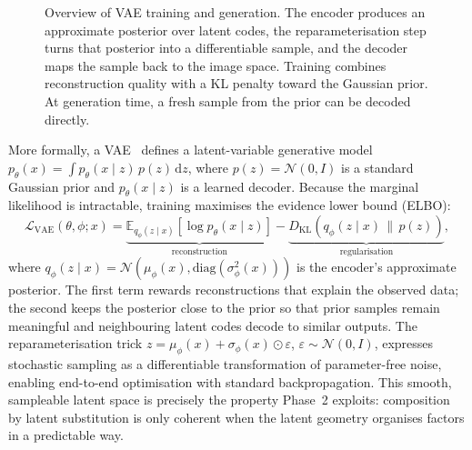\begin{figure}[t]
{%
    }
    \caption{Overview of VAE training and generation. The encoder produces an approximate
    posterior over latent codes, the reparameterisation step turns that posterior into a
    differentiable sample, and the decoder maps the sample back to the image space.
    Training combines reconstruction quality with a KL penalty toward the Gaussian prior.
    At generation time, a fresh sample from the prior can be decoded directly.}
    \label{fig:vae_architecture}
\end{figure}

More formally, a VAE~\citep{kingma2013auto} defines a latent-variable generative model
$p_\theta(x) = \int p_\theta(x \mid z)\,p(z)\,\mathrm{d}z$, where $p(z) = \mathcal{N}(0, I)$
is a standard Gaussian prior and $p_\theta(x \mid z)$ is a learned decoder. Because the
marginal likelihood is intractable, training maximises the evidence lower bound (ELBO):
\begin{equation}
    \mathcal{L}_{\mathrm{VAE}}(\theta, \phi; x)
    = \underbrace{\mathbb{E}_{q_\phi(z \mid x)}\!\left[\log p_\theta(x \mid z)\right]}_{\text{reconstruction}}
    -\underbrace{D_{\mathrm{KL}}\!\left(q_\phi(z \mid x)\,\|\,p(z)\right)}_{\text{regularisation}},
    \label{eq:elbo}
\end{equation}
where $q_\phi(z \mid x) = \mathcal{N}(\mu_\phi(x), \mathrm{diag}(\sigma^2_\phi(x)))$ is the
encoder's approximate posterior. The first term rewards reconstructions that explain the
observed data; the second keeps the posterior close to the prior so that prior samples
remain meaningful and neighbouring latent codes decode to similar outputs. The
reparameterisation trick $z = \mu_\phi(x) + \sigma_\phi(x) \odot \varepsilon$,
$\varepsilon \sim \mathcal{N}(0, I)$, expresses stochastic sampling as a differentiable
transformation of parameter-free noise, enabling end-to-end optimisation with standard
backpropagation. This smooth, sampleable latent space is precisely the property Phase~2
exploits: composition by latent substitution is only coherent when the latent geometry
organises factors in a predictable way.


